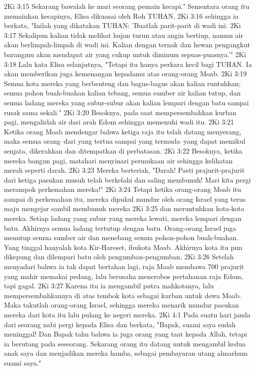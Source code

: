 2Ki 3:15  Sekarang bawalah ke mari seorang pemain kecapi." Sementara orang itu memainkan kecapinya, Elisa dikuasai oleh Roh TUHAN,
2Ki 3:16  sehingga ia berkata, "Inilah yang dikatakan TUHAN: 'Buatlah parit-parit di wadi ini.
2Ki 3:17  Sekalipun kalian tidak melihat hujan turun atau angin bertiup, namun air akan berlimpah-limpah di wadi ini. Kalian dengan ternak dan hewan pengangkut barangmu akan mendapat air yang cukup untuk diminum sepuas-puasnya.'"
2Ki 3:18  Lalu kata Elisa selanjutnya, "Tetapi itu hanya perkara kecil bagi TUHAN. Ia akan memberikan juga kemenangan kepadamu atas orang-orang Moab.
2Ki 3:19  Semua kota mereka yang berbenteng dan bagus-bagus akan kalian runtuhkan; semua pohon buah-buahan kalian tebang, semua sumber air kalian tutup, dan semua ladang mereka yang subur-subur akan kalian lempari dengan batu sampai rusak sama sekali."
2Ki 3:20  Besoknya, pada saat mempersembahkan kurban pagi, mengalirlah air dari arah Edom sehingga memenuhi wadi itu.
2Ki 3:21  Ketika orang Moab mendengar bahwa ketiga raja itu telah datang menyerang, maka semua orang--dari yang tertua sampai yang termuda--yang dapat memikul senjata, dikerahkan dan ditempatkan di perbatasan.
2Ki 3:22  Besoknya, ketika mereka bangun pagi, matahari menyinari permukaan air sehingga kelihatan merah seperti darah.
2Ki 3:23  Mereka berteriak, "Darah! Pasti prajurit-prajurit dari ketiga pasukan musuh telah berkelahi dan saling membunuh! Mari kita pergi merampok perkemahan mereka!"
2Ki 3:24  Tetapi ketika orang-orang Moab itu sampai di perkemahan itu, mereka dipukul mundur oleh orang Israel yang terus maju mengejar sambil membunuh mereka
2Ki 3:25  dan meruntuhkan kota-kota mereka. Setiap ladang yang subur yang mereka lewati, mereka lempari dengan batu. Akhirnya semua ladang tertutup dengan batu. Orang-orang Israel juga menutup semua sumber air dan menebang semua pohon-pohon buah-buahan. Yang tinggal hanyalah kota Kir-Hareset, ibukota Moab. Akhirnya kota itu pun dikepung dan dilempari batu oleh pengumban-pengumban.
2Ki 3:26  Setelah menyadari bahwa ia tak dapat bertahan lagi, raja Moab membawa 700 prajurit yang mahir memakai pedang, lalu berusaha menerobos pertahanan raja Edom, tapi gagal.
2Ki 3:27  Karena itu ia mengambil putra mahkotanya, lalu mempersembahkannya di atas tembok kota sebagai kurban untuk dewa Moab. Maka takutlah orang-orang Israel, sehingga mereka menarik mundur pasukan mereka dari kota itu lalu pulang ke negeri mereka.
2Ki 4:1  Pada suatu hari janda dari seorang nabi pergi kepada Elisa dan berkata, "Bapak, suami saya sudah meninggal! Dan Bapak tahu bahwa ia juga orang yang taat kepada Allah, tetapi ia berutang pada seseorang. Sekarang orang itu datang untuk mengambil kedua anak saya dan menjadikan mereka hamba, sebagai pembayaran utang almarhum suami saya."
